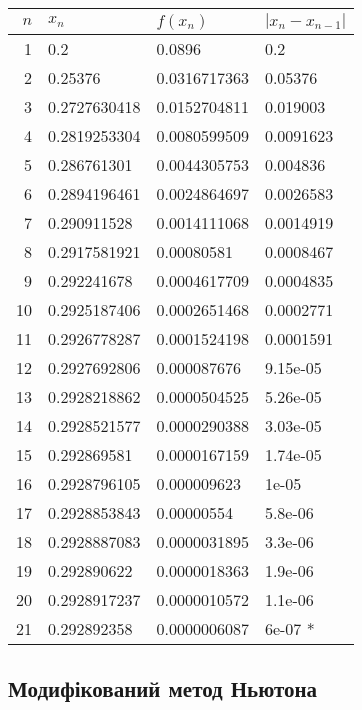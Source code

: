 \begin{table}[H]
    \centering
    \begin{tabular}{|r|l|l|l|}
        \hline
        $n$ & $x_n$ & $f(x_n)$ & $|x_n - x_{n-1}|$ \\ \hline
        1 & 0.2 & 0.0896 & 0.2 \\
        2 & 0.25376 & 0.0316717363 & 0.05376 \\
        3 & 0.2727630418 & 0.0152704811 & 0.019003 \\
        4 & 0.2819253304 & 0.0080599509 & 0.0091623 \\
        5 & 0.286761301 & 0.0044305753 & 0.004836 \\
        6 & 0.2894196461 & 0.0024864697 & 0.0026583 \\
        7 & 0.290911528 & 0.0014111068 & 0.0014919 \\
        8 & 0.2917581921 & 0.00080581 & 0.0008467 \\
        9 & 0.292241678 & 0.0004617709 & 0.0004835 \\
        10 & 0.2925187406 & 0.0002651468 & 0.0002771 \\
        11 & 0.2926778287 & 0.0001524198 & 0.0001591 \\
        12 & 0.2927692806 & 0.000087676 & 9.15e-05 \\
        13 & 0.2928218862 & 0.0000504525 & 5.26e-05 \\
        14 & 0.2928521577 & 0.0000290388 & 3.03e-05 \\
        15 & 0.292869581 & 0.0000167159 & 1.74e-05 \\
        16 & 0.2928796105 & 0.000009623 & 1e-05 \\
        17 & 0.2928853843 & 0.00000554 & 5.8e-06 \\
        18 & 0.2928887083 & 0.0000031895 & 3.3e-06 \\
        19 & 0.292890622 & 0.0000018363 & 1.9e-06 \\
        20 & 0.2928917237 & 0.0000010572 & 1.1e-06 \\
        21 & 0.292892358 & 0.0000006087 & 6e-07 * \\ \hline
    \end{tabular}
\end{table}

\subsection{Модифікований метод Ньютона}

